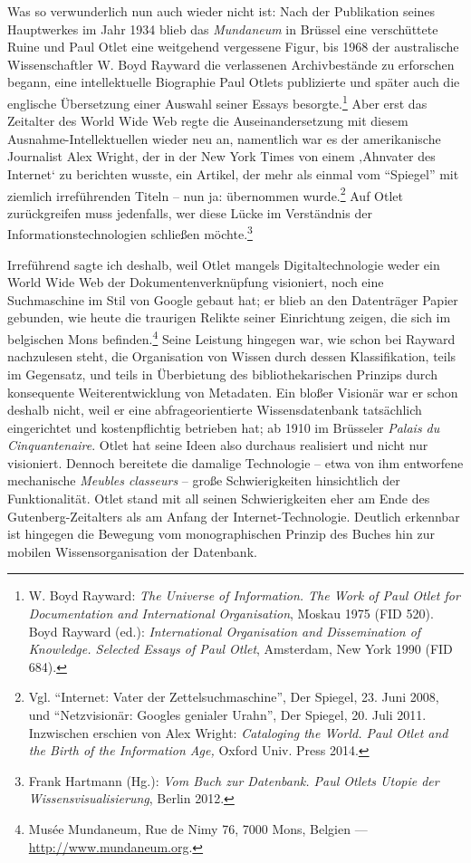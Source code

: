 Was so verwunderlich nun auch wieder nicht ist: Nach der Publikation
seines Hauptwerkes im Jahr 1934 blieb das \emph{Mundaneum} in Brüssel
eine verschüttete Ruine und Paul Otlet eine weitgehend vergessene Figur,
bis 1968 der australische Wissenschaftler W. Boyd Rayward die
verlassenen Archivbestände zu erforschen begann, eine intellektuelle
Biographie Paul Otlets publizierte und später auch die englische
Übersetzung einer Auswahl seiner Essays besorgte.\footnote{W. Boyd
  Rayward: \emph{The Universe of Information. The Work of Paul Otlet for
  Documentation and International Organisation}, Moskau 1975 (FID 520).
  Boyd Rayward (ed.): \emph{International Organisation and Dissemination
  of Knowledge. Selected Essays of Paul Otlet}, Amsterdam, New York 1990
  (FID 684).} Aber erst das Zeitalter des World Wide Web regte die
Auseinandersetzung mit diesem Ausnahme-Intellektuellen wieder neu an,
namentlich war es der amerikanische Journalist Alex Wright, der in der
New York Times von einem ‚Ahnvater des Internet` zu berichten wusste,
ein Artikel, der mehr als einmal vom \enquote{Spiegel} mit ziemlich
irreführenden Titeln -- nun ja: übernommen wurde.\footnote{Vgl.
  \enquote{Internet: Vater der Zettelsuchmaschine}, Der Spiegel, 23.
  Juni 2008, und \enquote{Netzvisionär: Googles genialer Urahn}, Der
  Spiegel, 20. Juli 2011. Inzwischen erschien von Alex Wright:
  \emph{Cataloging the World. Paul Otlet and the Birth of the
  Information Age,} Oxford Univ. Press 2014.} Auf Otlet zurückgreifen
muss jedenfalls, wer diese Lücke im Verständnis der
Informationstechnologien schließen möchte.\footnote{Frank Hartmann
  (Hg.): \emph{Vom Buch zur Datenbank. Paul Otlets Utopie der
  Wissensvisualisierung}, Berlin 2012.}

Irreführend sagte ich deshalb, weil Otlet mangels Digitaltechnologie
weder ein World Wide Web der Dokumentenverknüpfung visioniert, noch eine
Suchmaschine im Stil von Google gebaut hat; er blieb an den Datenträger
Papier gebunden, wie heute die traurigen Relikte seiner Einrichtung
zeigen, die sich im belgischen Mons befinden.\footnote{Musée Mundaneum,
  Rue de Nimy 76, 7000 Mons, Belgien --- \url{http://www.mundaneum.org}.}
Seine Leistung hingegen war, wie schon bei Rayward nachzulesen steht,
die Organisation von Wissen durch dessen Klassifikation, teils im
Gegensatz, und teils in Überbietung des bibliothekarischen Prinzips
durch konsequente Weiterentwicklung von Metadaten. Ein bloßer Visionär
war er schon deshalb nicht, weil er eine abfrageorientierte
Wissensdatenbank tatsächlich eingerichtet und kostenpflichtig betrieben
hat; ab 1910 im Brüsseler \emph{Palais du Cinquantenaire}. Otlet hat
seine Ideen also durchaus realisiert und nicht nur visioniert. Dennoch
bereitete die damalige Technologie -- etwa von ihm entworfene
mechanische \emph{Meubles classeurs} -- große Schwierigkeiten
hinsichtlich der Funktionalität. Otlet stand mit all seinen
Schwierigkeiten eher am Ende des Gutenberg-Zeitalters als am Anfang der
Internet-Technologie. Deutlich erkennbar ist hingegen die Bewegung vom
monographischen Prinzip des Buches hin zur mobilen Wissensorganisation
der Datenbank.

